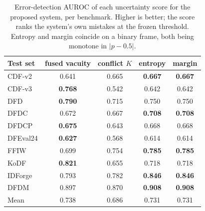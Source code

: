\begin{table}[t]
\centering
\caption{Error-detection AUROC of each uncertainty score for the proposed system, per benchmark. Higher is better; the score ranks the system's own mistakes at the frozen threshold. Entropy and margin coincide on a binary frame, both being monotone in $|p-0.5|$.}
\label{tab:uncertainty}
\small
\begin{tabular}{lcccc}
\toprule
Test set & fused vacuity & conflict $K$ & entropy & margin \\
\midrule
CDF-v2 & 0.641 & 0.665 & \textbf{0.667} & \textbf{0.667} \\
CDF-v3 & \textbf{0.768} & 0.542 & 0.642 & 0.642 \\
DFD & \textbf{0.790} & 0.715 & 0.750 & 0.750 \\
DFDC & 0.672 & 0.667 & \textbf{0.708} & \textbf{0.708} \\
DFDCP & \textbf{0.675} & 0.643 & 0.668 & 0.668 \\
DFEval24 & \textbf{0.627} & 0.568 & 0.614 & 0.614 \\
FFIW & 0.699 & 0.754 & \textbf{0.785} & \textbf{0.785} \\
KoDF & \textbf{0.821} & 0.655 & 0.718 & 0.718 \\
IDForge & 0.793 & 0.782 & \textbf{0.846} & \textbf{0.846} \\
DFDM & 0.897 & 0.870 & \textbf{0.908} & \textbf{0.908} \\
\midrule
Mean & 0.738 & 0.686 & 0.731 & 0.731 \\
\bottomrule
\end{tabular}
\end{table}
